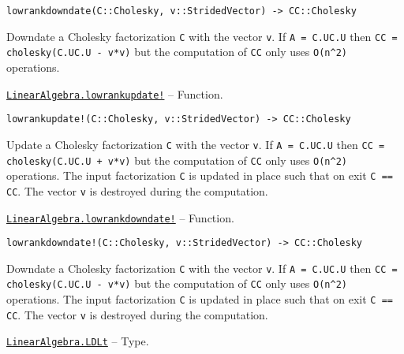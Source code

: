\begin{adjustwidth}{2em}{0pt}


\begin{verbatim}
lowrankdowndate(C::Cholesky, v::StridedVector) -> CC::Cholesky
\end{verbatim}

Downdate a Cholesky factorization \texttt{C} with the vector \texttt{v}. If \texttt{A = C.U{\textquotesingle}C.U} then \texttt{CC = cholesky(C.U{\textquotesingle}C.U - v*v{\textquotesingle})} but the computation of \texttt{CC} only uses \texttt{O(n{\textasciicircum}2)} operations.



\end{adjustwidth}
\hypertarget{2909160594931213214}{} 
\hyperlink{2909160594931213214}{\texttt{LinearAlgebra.lowrankupdate!}}  -- {Function.}

\begin{adjustwidth}{2em}{0pt}


\begin{verbatim}
lowrankupdate!(C::Cholesky, v::StridedVector) -> CC::Cholesky
\end{verbatim}

Update a Cholesky factorization \texttt{C} with the vector \texttt{v}. If \texttt{A = C.U{\textquotesingle}C.U} then \texttt{CC = cholesky(C.U{\textquotesingle}C.U + v*v{\textquotesingle})} but the computation of \texttt{CC} only uses \texttt{O(n{\textasciicircum}2)} operations. The input factorization \texttt{C} is updated in place such that on exit \texttt{C == CC}. The vector \texttt{v} is destroyed during the computation.



\end{adjustwidth}
\hypertarget{15152518260640180506}{} 
\hyperlink{15152518260640180506}{\texttt{LinearAlgebra.lowrankdowndate!}}  -- {Function.}

\begin{adjustwidth}{2em}{0pt}


\begin{verbatim}
lowrankdowndate!(C::Cholesky, v::StridedVector) -> CC::Cholesky
\end{verbatim}

Downdate a Cholesky factorization \texttt{C} with the vector \texttt{v}. If \texttt{A = C.U{\textquotesingle}C.U} then \texttt{CC = cholesky(C.U{\textquotesingle}C.U - v*v{\textquotesingle})} but the computation of \texttt{CC} only uses \texttt{O(n{\textasciicircum}2)} operations. The input factorization \texttt{C} is updated in place such that on exit \texttt{C == CC}. The vector \texttt{v} is destroyed during the computation.



\end{adjustwidth}
\hypertarget{5189218595453722756}{} 
\hyperlink{5189218595453722756}{\texttt{LinearAlgebra.LDLt}}  -- {Type.}


